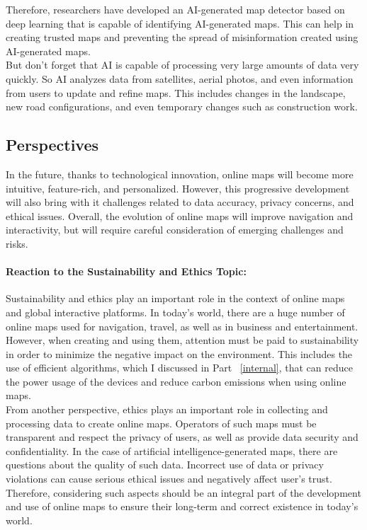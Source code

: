 \documentclass[10pt,oneside,english,a4paper]{article}
\begin{document}
Therefore, researchers have developed an AI-generated map detector based on deep learning that is capable of identifying AI-generated maps. This can help in creating trusted maps and preventing the spread of misinformation created using AI-generated maps.
\\But don't forget that AI is capable of processing very large amounts of data very quickly. So AI analyzes data from satellites, aerial photos, and even information from users to update and refine maps. This includes changes in the landscape, new road configurations, and even temporary changes such as construction work.

\subsection{Perspectives} \label{future:perspectives}
In the future, thanks to technological innovation, online maps will become more intuitive, feature-rich, and personalized. However, this progressive development will also bring with it challenges related to data accuracy, privacy concerns, and ethical issues. Overall, the evolution of online maps will improve navigation and interactivity, but will require careful consideration of emerging challenges and risks.

\paragraph{Reaction to the Sustainability and Ethics Topic:}
Sustainability and ethics play an important role in the context of online maps and global interactive platforms. In today's world, there are a huge number of online maps used for navigation, travel, as well as in business and entertainment. However, when creating and using them, attention must be paid to sustainability in order to minimize the negative impact on the environment. This includes the use of efficient algorithms, which I discussed in Part ~\ref{internal}, that can reduce the power usage of the devices and reduce carbon emissions when using online maps.
\\From another perspective, ethics plays an important role in collecting and processing data to create online maps. Operators of such maps must be transparent and respect the privacy of users, as well as provide data security and confidentiality. In the case of artificial intelligence-generated maps, there are questions about the quality of such data. Incorrect use of data or privacy violations can cause serious ethical issues and negatively affect user's trust. Therefore, considering such aspects should be an integral part of the development and use of online maps to ensure their long-term and correct existence in today's world.
\end{document}
